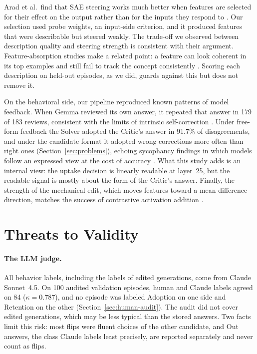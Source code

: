Arad et al.\ find that SAE steering works much better when features are
selected for their effect on the output rather than for the inputs they
respond to
\cite{arad2025steering}. Our selection used probe weights, an input-side
criterion, and it produced features that were describable but steered weakly.
The trade-off we observed between description quality and steering strength
is consistent with their argument. Feature-absorption studies make a related
point: a feature can look coherent in its top examples and still fail to track
the concept consistently \cite{chanin2024absorption}. Scoring each description
on held-out episodes, as we did, guards against this but does not remove it.

On the behavioral side, our pipeline reproduced known patterns of model
feedback. When Gemma reviewed its own answer, it repeated that answer in 179
of 183 reviews, consistent with the limits of intrinsic self-correction
\cite{huang2024selfcorrect}. Under free-form feedback the Solver adopted the
Critic's answer in 91.7\% of disagreements, and under the candidate format it
adopted wrong corrections more often than right ones
(Section~\ref{sec:problems}), echoing sycophancy findings in which models
follow an expressed view at the cost of accuracy \cite{sharma2024sycophancy}.
What this study adds is an internal view: the uptake decision is linearly
readable at layer~25, but the readable signal is mostly about the form of the
Critic's answer. Finally, the strength of the mechanical edit, which moves
features toward a mean-difference direction, matches the success of
contrastive activation addition \cite{panickssery2023caa}.

\section{Threats to Validity}

\paragraph{The LLM judge.} All behavior labels, including the labels of edited
generations, come from Claude Sonnet~4.5. On 100 audited validation episodes,
human and Claude labels agreed on 84 ($\kappa = 0.787$), and no episode was
labeled Adoption on one side and Retention on the other
(Section~\ref{sec:human-audit}). The audit did not cover edited generations,
which may be less typical than the stored answers. Two facts limit this risk:
most flips were fluent choices of the other candidate, and Out answers, the
class Claude labels least precisely, are reported separately and never count
as flips.


